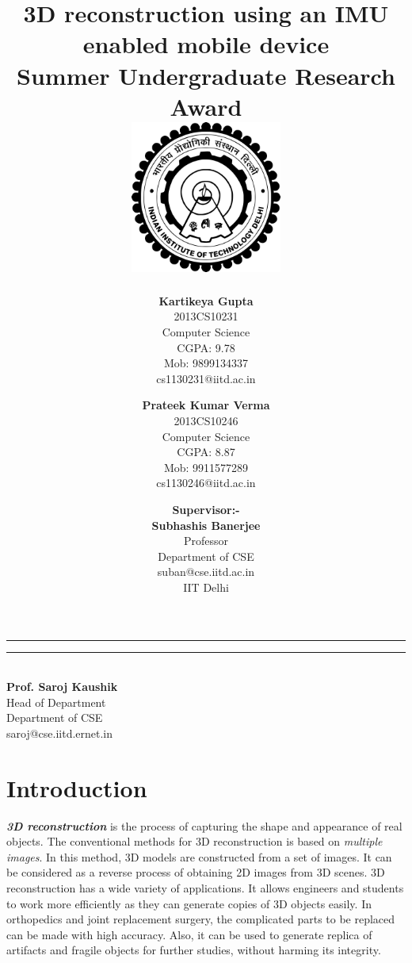 \documentclass{article}
\title{\vspace*{\fill} \textbf{3D reconstruction using an IMU enabled mobile device}
	  \\ {\large \textbf{Summer Undergraduate Research Award}}
	  \\  \vspace{3mm} \includegraphics[width=5cm]{logo.png}}
\author{
	\textbf{Kartikeya Gupta}\\ 
	2013CS10231\\
	Computer Science\\
	CGPA: 9.78 \\
	Mob: 9899134337\\
	cs1130231@iitd.ac.in
	\and
	\textbf{Prateek Kumar Verma}\\ 
	2013CS10246\\
	Computer Science\\
	CGPA: 8.87\\
	Mob: 9911577289\\
	cs1130246@iitd.ac.in
}
\date{\textbf{Supervisor:-} \\ \textbf{Subhashis Banerjee} \\ Professor \\ Department of CSE \\ suban@cse.iitd.ac.in\\ IIT Delhi\\
\vspace*{\fill}}
\makeatletter
\newcommand{\namesigdate}[2][5cm]{%
  \begin{tabular}{@{}p{#1}@{}}
    #2 \\[0.4\normalbaselineskip] \hrule \\[0pt]
    {\small } \\[2\normalbaselineskip] 
  \end{tabular}
}
\makeatother
\begin{document}
	\maketitle


\begin{center}
\noindent\rule{3.2cm}{0.4pt} 
\end{center}

\begin{flushright}
\noindent\rule{3.2cm}{0.4pt} 
\\ \textbf{Prof. Saroj Kaushik}
\\ Head of Department
\\ Department of CSE
\\ saroj@cse.iitd.ernet.in
\end{flushright}


	\newpage
	
	\section{Introduction}
		\textit{\textbf{3D reconstruction}} is the process of capturing the shape and appearance of real objects. The conventional methods for 3D reconstruction is based on \textit{multiple images}. In this method, 3D models are constructed from a set of images. It can be considered as a reverse process of obtaining 2D images from 3D scenes.
		\newline
		3D reconstruction has a wide variety of applications. It allows engineers and students to work more efficiently as they can generate copies of 3D objects easily. In orthopedics and joint replacement surgery, the complicated parts to be replaced can be made with high accuracy. Also, it can be used to generate replica of artifacts and fragile objects for further studies, without harming its integrity.
\end{document}
